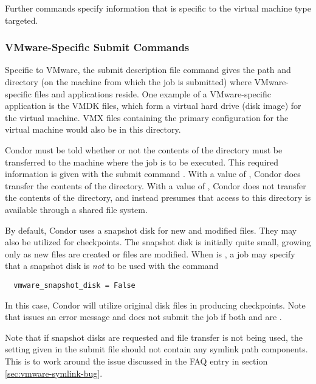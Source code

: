 Further commands specify information that is specific to the
virtual machine type targeted.

\subsubsection{\label{sec:vm-VMwaresubmitfile}VMware-Specific Submit Commands}

Specific to VMware, the submit description file command
 gives the path and directory
(on the machine from which the job is submitted)
where VMware-specific files and applications reside.
One example of a VMware-specific application is the VMDK files,
which form a virtual hard drive (disk image) for the virtual machine.
VMX files containing the primary configuration for the virtual
machine would also be in this directory.

Condor must be told whether or not the contents of the 
directory must be transferred to the machine where the job is
to be executed.
This required information is given with the submit command
.
With a value of ,
Condor does transfer the contents of the directory.
With a value of ,
Condor does not transfer the contents of the directory,
and instead presumes that access to this directory is
available through a shared file system.

By default, Condor uses a snapshot disk for new and modified files.
They may also be utilized for checkpoints.
The snapshot disk is initially quite small,
growing only as new files are created or files are modified.
When  is ,
a job may specify that a snapshot disk is \emph{not} to be
used with the command
\begin{verbatim}
  vmware_snapshot_disk = False
\end{verbatim}
In this case, Condor will utilize original disk files in producing
checkpoints. 
Note that  issues an error message and does not
submit the job if both 
and  are .

Note that if snapshot disks are requested and file transfer is not
being used, the  setting given in the submit
file should not contain any symlink path components. This is to work
around the issue discussed in the FAQ entry in section~
\ref{sec:vmware-symlink-bug}.

